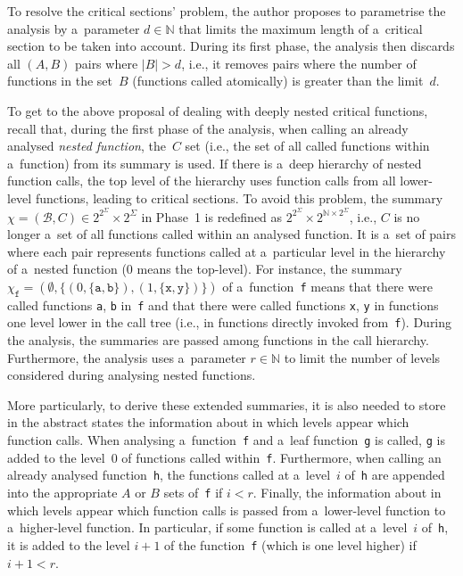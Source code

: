 To resolve the  critical sections' problem, the author proposes to parametrise the analysis by a~parameter $ d \in \mathbb{N} $ that limits the maximum length of a~critical section to be taken into account. During its first phase, the analysis then discards all $ (A, B) $ pairs where $ |B| > d $, i.e., it removes pairs where the number of functions in the set~$ B $ (functions called atomically) is greater than the limit~$ d $.

To get to the above proposal of dealing with deeply nested critical functions, recall that, during the first phase of the analysis, when calling an already analysed \emph{nested function}, the~$ C $ set (i.e., the set of all called functions within a~function) from its summary is used. If there is a~deep hierarchy of nested function calls, the top level of the hierarchy uses function calls from all lower-level functions, leading to  critical sections. To avoid this problem, the summary $ \chi = (\mathcal{B}, C) \in 2^{2^\Sigma} \times 2^\Sigma $ in Phase~1 is redefined as $ 2^{2^\Sigma} \times 2^{\mathbb{N} \times 2^\Sigma} $, i.e., $ C $ is no longer a~set of all functions called within an analysed function. It is a~set of pairs where each pair represents functions called at a~particular level in the hierarchy of a~nested function (0 means the top-level). For instance, the summary $ \chi_\mathtt{f} = (\emptyset, \{(0, \{\mathtt{a}, \mathtt{b}\}), (1, \{\mathtt{x}, \mathtt{y}\})\}) $ of a~function~\texttt{f} means that there were called functions \texttt{a}, \texttt{b} in~\texttt{f} and that there were called functions \texttt{x}, \texttt{y} in functions one level lower in the call tree (i.e., in functions directly invoked from~\texttt{f}). During the analysis, the summaries are passed among functions in the call hierarchy. Furthermore, the analysis uses a~parameter $ r \in \mathbb{N} $ to limit the number of levels considered during analysing nested functions.

More particularly, to derive these extended summaries, it is also needed to store in the abstract states the information about in which levels appear which function calls. When analysing a~function~\texttt{f} and a~leaf function~\texttt{g} is called, \texttt{g} is added to the level~0 of functions called within~\texttt{f}. Furthermore, when calling an already analysed function~\texttt{h}, the functions called at a~level~$ i $ of~\texttt{h} are appended into the appropriate $ A $ or $ B $ sets of~\texttt{f} if $ i < r $. Finally, the information about in which levels appear which function calls is passed from a~lower-level function to a~higher-level function. In particular, if some function is called at a~level~$ i $ of~\texttt{h}, it is added to the level $ i + 1 $ of the function~\texttt{f} (which is one level higher) if $ i + 1 < r $.

